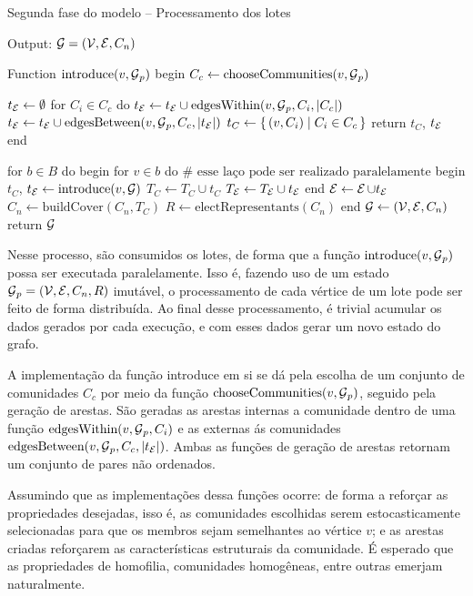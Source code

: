 \documentclass[notes.tex]{subfiles}
\begin{document}
\begin{quadro}[htbp]
\caption{Segunda fase do modelo -- Processamento dos lotes}
\label{qua:fase_2_2}
\begin{algorithm}
Output: $\operatorname{\mathcal{G}} = (\operatorname{\mathcal{V}}, \operatorname{\mathcal{E}}, C_n)$

Function $\text{introduce}(v, \operatorname{\mathcal{G}}_p)$
begin
    $C_c \leftarrow \text{chooseCommunities}(v, \operatorname{\mathcal{G}}_p)$

    $t_{\operatorname{\mathcal{E}}}\leftarrow \emptyset$
    for $C_i \in C_c$ do $t_{\operatorname{\mathcal{E}}}\leftarrow t_{\operatorname{\mathcal{E}}}\cup\text{edgesWithin}(v, \operatorname{\mathcal{G}}_p, C_i, |C_c|)$
    $t_{\operatorname{\mathcal{E}}}\leftarrow t_{\operatorname{\mathcal{E}}}\cup\text{edgesBetween}(v, \operatorname{\mathcal{G}}_p, C_c, |t_{\operatorname{\mathcal{E}}}|)$
    $t_C \leftarrow \set{(v, C_i) | C_i \in C_c}$
    return $t_C$,  $t_{\operatorname{\mathcal{E}}}$
end

for $b \in B$ do
begin
    for $v \in b$ do #  $\text{esse laço pode ser realizado paralelamente}$
    begin
        $t_C$, $t_{\operatorname{\mathcal{E}}}\leftarrow \text{introduce}(v, \operatorname{\mathcal{G}})$
        $T_C \leftarrow T_C \cup t_C$
        $T_{\operatorname{\mathcal{E}}}\leftarrow T_{\operatorname{\mathcal{E}}}\cup t_{\operatorname{\mathcal{E}}}$
    end
    $\operatorname{\mathcal{E}} \leftarrow \operatorname{\mathcal{E}} \cup t_{\operatorname{\mathcal{E}}}$
    $C_n \leftarrow \text{buildCover}(C_n, T_C)$
    $R \leftarrow \text{electRepresentants}(C_n)$
end
$\operatorname{\mathcal{G}} \leftarrow (\operatorname{\mathcal{V}}, \operatorname{\mathcal{E}}, C_n)$ 
return $\operatorname{\mathcal{G}}$
\end{algorithm}
\end{quadro}

Nesse processo, são consumidos os lotes, de forma que a função $\text{introduce}(v, \operatorname{\mathcal{G}}_p)$ possa ser executada paralelamente.
Isso é, fazendo uso de um estado $\operatorname{\mathcal{G}}_p = (\operatorname{\mathcal{V}}, \operatorname{\mathcal{E}}, C_n, R)$ imutável, o processamento de cada vértice de um lote pode ser feito de forma distribuída.
Ao final desse processamento, é trivial acumular os dados gerados por cada execução, e com esses dados gerar um novo estado do grafo.

A implementação da função introduce em si se dá pela escolha de um conjunto de comunidades $C_c$ por meio da função $\text{chooseCommunities}(v, \operatorname{\mathcal{G}}_p)$, seguido pela geração de arestas.
São geradas as arestas internas a comunidade dentro de uma função $\text{edgesWithin}(v, \operatorname{\mathcal{G}}_p, C_i)$ e as externas ás comunidades $\text{edgesBetween}(v, \operatorname{\mathcal{G}}_p, C_c, |t_{\operatorname{\mathcal{E}}}|)$.
Ambas as funções de geração de arestas retornam um conjunto de pares não ordenados.

Assumindo que as implementações dessa funções ocorre: de forma a reforçar as propriedades desejadas, isso é,
as comunidades escolhidas serem estocasticamente selecionadas para que os membros sejam semelhantes ao vértice $v$;
e as arestas criadas reforçarem as características estruturais da comunidade.
É esperado que as propriedades de homofilia, comunidades homogêneas, entre outras emerjam naturalmente.
\end{document}
